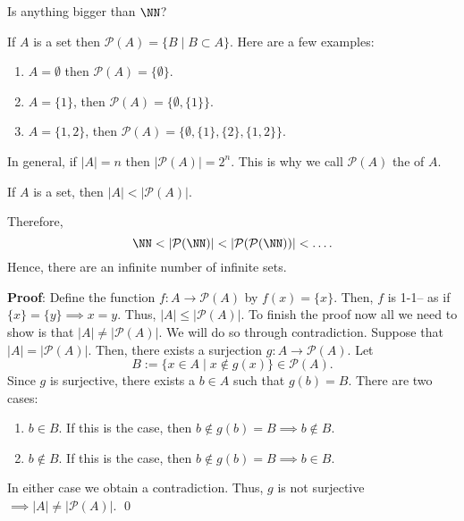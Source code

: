 
\begin{question}
Is anything bigger than $\NN$?
\end{question}

\noindent If $A$ is a set then $\mathcal P(A) = \{B\mid B\subset A\}$. Here are a few examples:
\begin{enumerate}
    \item $A = \emptyset$ then $\mathcal P(A) = \{\emptyset\}$.
    \item $A = \{1\}$, then $\mathcal P(A) = \{\emptyset, \{1\}\}$.
    \item $A = \{1,2\}$, then $\mathcal P(A) = \{\emptyset, \{1\}, \{2\}, \{1,2\}\}$.
\end{enumerate}
In general, if $|A| = n$ then $|\mathcal P(A)| = 2^n$. This is why we call $\mathcal P(A)$ the  of $A$.%
\begin{theorem}[Cantor]
If $A$ is a set, then $|A| < |\mathcal P(A)|$.
\end{theorem}
\begin{remark}
Therefore, 
\[
\NN < |\mathcal P(\NN)| < |\mathcal P(\mathcal P(\NN))| < \dots.
\]
Hence, there are an infinite number of infinite sets.
\end{remark}

\textbf{Proof}: Define the function $f:A\to \mathcal P(A)$ by $f(x) = \{x\}$. Then, $f$ is 1-1-- as if $\{x\} = \{y\}\implies x=y$. Thus, $|A| \leq |\mathcal P(A)|$. To finish the proof now all we need to show is that $|A|\neq |\mathcal P(A)|$. We will do so through contradiction. Suppose that $|A| = |\mathcal P(A)|$. Then, there exists a surjection $g:A\to \mathcal P(A)$. Let 
\[
B := \{x\in A\mid x\notin g(x)\}\in \mathcal P(A).
\]
Since $g$ is surjective, there exists a $b\in A$ such that $g(b) = B$. There are two cases:
\begin{enumerate}
    \item $b\in B$. If this is the case, then $b\notin g(b) = B \implies b\notin B$.
    \item $b\notin B$. If this is the case, then $b\notin g(b) = B \implies b\in B$.
\end{enumerate}
In either case we obtain a contradiction. Thus, $g$ is not surjective $\implies |A|\neq |\mathcal P(A)|$. \qed

